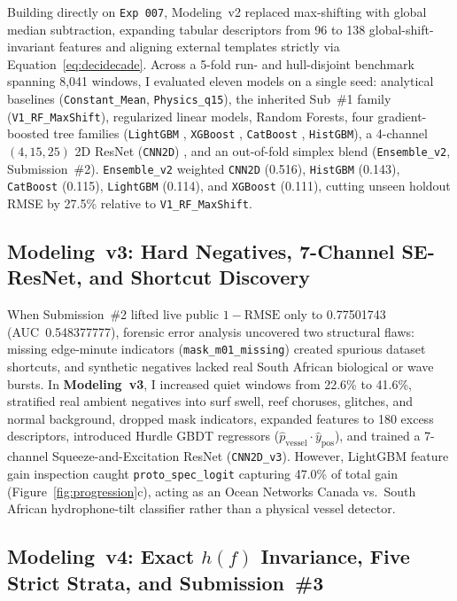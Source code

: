 \documentclass[10pt,a4paper]{article}
\begin{document}
Building directly on \texttt{Exp~007}, Modeling~v2 replaced max-shifting with global median subtraction, expanding tabular descriptors from 96 to 138 global-shift-invariant features and aligning external templates strictly via Equation~\eqref{eq:decidecade}. Across a 5-fold run- and hull-disjoint benchmark spanning 8,041 windows, I evaluated eleven models on a single seed: analytical baselines (\texttt{Constant\_Mean}, \texttt{Physics\_q15}), the inherited Sub~\#1 family (\texttt{V1\_RF\_MaxShift}), regularized linear models, Random Forests, four gradient-boosted tree families (\texttt{LightGBM} \parencite{ke2017lightgbm}, \texttt{XGBoost} \parencite{chen2016xgboost}, \texttt{CatBoost} \parencite{prokhorenkova2018catboost}, \texttt{HistGBM}), a 4-channel $(4,15,25)$ 2D ResNet (\texttt{CNN2D}) \parencite{he2016resnet}, and an out-of-fold simplex blend (\texttt{Ensemble\_v2}, Submission~\#2). \texttt{Ensemble\_v2} weighted \texttt{CNN2D} (0.516), \texttt{HistGBM} (0.143), \texttt{CatBoost} (0.115), \texttt{LightGBM} (0.114), and \texttt{XGBoost} (0.111), cutting unseen holdout RMSE by 27.5\% relative to \texttt{V1\_RF\_MaxShift}.

\subsection{Modeling~v3: Hard Negatives, 7-Channel SE-ResNet, and Shortcut Discovery}

When Submission~\#2 lifted live public $1-\mathrm{RMSE}$ only to 0.77501743 (AUC~0.548377777), forensic error analysis uncovered two structural flaws: missing edge-minute indicators (\texttt{mask\_m01\_missing}) created spurious dataset shortcuts, and synthetic negatives lacked real South African biological or wave bursts. In \textbf{Modeling~v3}, I increased quiet windows from 22.6\% to 41.6\%, stratified real ambient negatives into surf swell, reef choruses, glitches, and normal background, dropped mask indicators, expanded features to 180 excess descriptors, introduced Hurdle GBDT regressors ($\hat{p}_{\mathrm{vessel}} \cdot \hat{y}_{\mathrm{pos}}$), and trained a 7-channel Squeeze-and-Excitation ResNet (\texttt{CNN2D\_v3}). However, LightGBM feature gain inspection caught \texttt{proto\_spec\_logit} capturing 47.0\% of total gain (Figure~\ref{fig:progression}c), acting as an Ocean Networks Canada vs.\ South African hydrophone-tilt classifier rather than a physical vessel detector.

\subsection{Modeling~v4: Exact \texorpdfstring{$h(f)$}{h(f)} Invariance, Five Strict Strata, and Submission~\#3}
\end{document}
